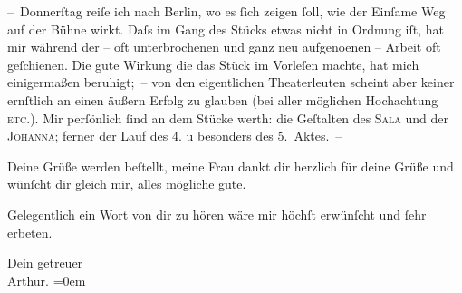\pstart
           – Donnerſtag reiſe ich nach Berlin,
               wo es{ }ſich zeigen{ }ſoll, wie der Einſame Weg auf
               der Bühne wirkt. Daſs im Gang des Stücks etwas nicht in Ordnung iſt, hat mir während
               der – oft unterbrochenen und ganz neu aufgeno{\geminationm}enen –
               Arbeit oft geſchienen. Die gute Wirkung {\pb}die das Stück im
               Vorleſen machte, hat mich einigermaßen beruhigt; – von den eigentlichen Theaterleuten
               scheint aber keiner ernſtlich an einen äußern Erfolg zu glauben (bei aller möglichen
               Hochachtung \textsc{etc.}). Mir perſönlich{ }ſind an dem Stücke werth:
               die Geſtalten des \textsc{Sala} und der \textsc{Johanna}; ferner der Lauf des 4. u besonders des 5. Aktes. –\pend
           
\pstart
           Deine Grüße werden beſtellt, meine Frau dankt dir herzlich {\pb}für deine Grüße und
               wünſcht dir gleich mir, alles mögliche gute.\pend
           
\pstart
           Gelegentlich ein Wort von dir zu hören wäre mir höchſt erwünſcht und{ }ſehr
               erbeten.\pend
           
\pstart
           Dein getreuer{\\[\baselineskip]}\spacefill\mbox{Arthur.}\pend
           \leftskip=0em{}\endnumbering{}  \newcommand{\dateiname}{L01368}\newcommand{\titel}{Arthur Schnitzler an Hermann Bahr, 1. 2. 1904}\newcommand{\editorInnen}{Herausgegeben von Martin Anton Müller}
